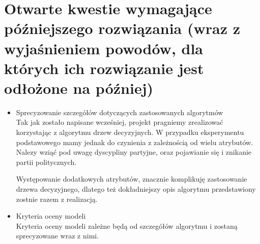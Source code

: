\documentclass[a4 14pt]{report}
\begin{document}
	\section{Otwarte kwestie wymagające późniejszego rozwiązania (wraz z wyjaśnieniem powodów, dla których ich rozwiązanie jest odłożone na później)}
	
		\begin{itemize}
			\item{Sprecyzowanie szczegółów dotyczących zastosowanych algorytmów}\\
				Tak jak zostało napisane wcześniej, projekt pragniemy zrealizować korzystając z algorytmu drzew decyzyjnych. 
				W przypadku eksperymentu podstawowego mamy jednak do czynienia z zależnością od wielu atrybutów. Nalezy wziąć pod uwagę dyscypliny partyjne, oraz pojawianie się i znikanie partii politycznych.
				
				Występowanie dodatkowych atrybutów, znacznie komplikuję zastosowanie drzewa decyzyjnego, dlatego też dokładniejszy opis algorytmu przedstawiony zostnie razem z realizacją.

			\item{Kryteria oceny modeli}\\
				 Kryteria oceny modeli zależne będą od szczegółów algorytmu i zostaną sprecyzowane wraz z nimi. 
		\end{itemize}	
\end{document}
